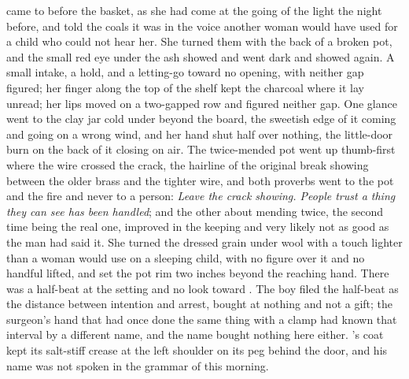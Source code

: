  came to  before the basket, as she had come at the going of the light the night before, and told the coals it was  in the voice another woman would have used for a child who could not hear her. She turned them with the back of a broken pot, and the small red eye under the ash showed and went dark and showed again. A small intake, a hold, and a letting-go toward no opening, with neither gap figured; her finger along the top of the shelf kept the charcoal where it lay unread; her lips moved on a two-gapped row and figured neither gap. One glance went to the clay jar cold under  beyond the board, the sweetish edge of it coming and going on a wrong wind, and her hand shut half over nothing, the little-door burn on the back of it closing on air. The twice-mended pot went up thumb-first where the wire crossed the crack, the hairline of the original break showing between the older brass and the tighter wire, and both proverbs went to the pot and the fire and never to a person: \emph{Leave the crack showing. People trust a thing they can see has been handled}; and the other about mending twice, the second time being the real one, improved in the keeping and very likely not as good as the man had said it. She turned the dressed grain under wool with a touch lighter than a woman would use on a sleeping child, with no figure over it and no handful lifted, and set the pot rim two inches beyond the reaching hand. There was a half-beat at the setting and no look toward . The boy filed the half-beat as the distance between intention and arrest, bought at nothing and not a gift; the surgeon's hand that had once done the same thing with a clamp had known that interval by a different name, and the name bought nothing here either. 's coat kept its salt-stiff crease at the left shoulder on its peg behind the door, and his name was not spoken in the grammar of this morning.

\scenebreak

